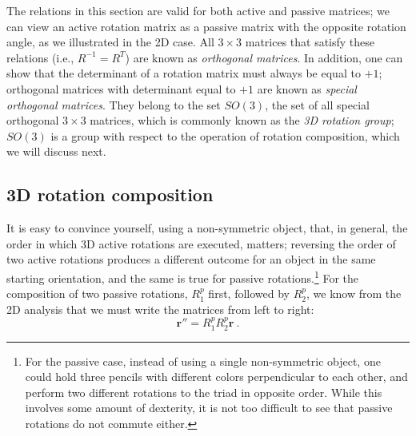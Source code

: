 The relations in this section are valid for both active and passive matrices; we can view an active rotation matrix as a passive matrix with the opposite rotation angle, as we illustrated in the 2D case.  All $3\times 3$ matrices that satisfy these relations (i.e., $R^{-1}=R^T$) are known as \textit{orthogonal matrices}.  In addition, one can show that the determinant of a rotation matrix must always be equal to $+1$; orthogonal matrices with determinant equal to $+1$ are known as \textit{special orthogonal matrices}.  They belong to the set $SO(3)$, the set of all special orthogonal $3\times 3$ matrices, which is commonly known as the \textit{3D rotation group};  $SO(3)$ is a group with respect to the operation of rotation composition, which we will discuss next.

\subsection{3D rotation composition}

It is easy to convince yourself, using a non-symmetric object, that, in general, the order in which 3D active rotations are executed, matters; reversing the order of two active rotations produces a different outcome for an object in the same starting orientation, and the same is true for passive rotations.\footnote{For the passive case, instead of using a single non-symmetric object, one could hold three pencils with different colors perpendicular to each other, and perform two different rotations to the triad in opposite order.  While this involves some amount of dexterity, it is not too difficult to see that passive rotations do not commute either.} For the composition of two passive rotations, $R^p_1$ first, followed by $R^p_2$, we know from the 2D analysis that we must write the matrices from left to right:
\begin{equation}
	\mathbf{r}'' = R^p_1 R^p_2\mathbf{r}\ .
\end{equation}

